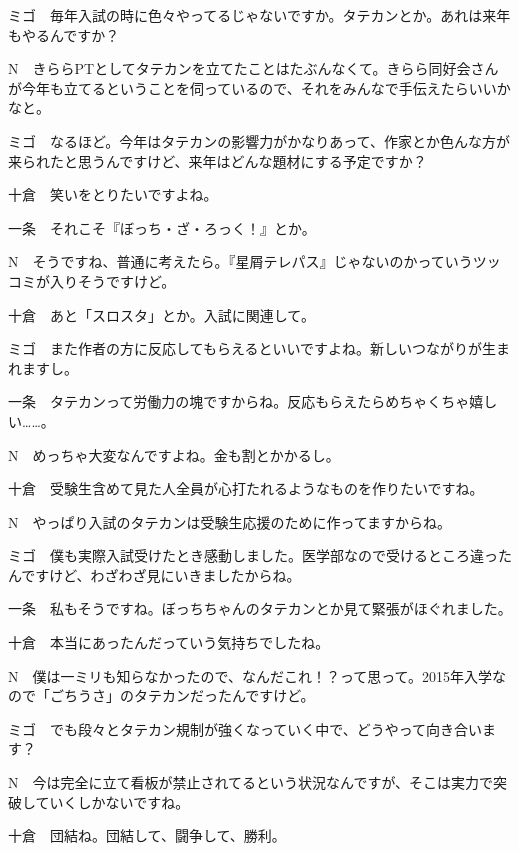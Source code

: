 \begin{multicols}{2}
\vspace{6mm}

\begin{description}
  \item{ミゴ}　毎年入試の時に色々やってるじゃないですか。タテカンとか。あれは来年もやるんですか？
  \item{N}　きららPTとしてタテカンを立てたことはたぶんなくて。きらら同好会さんが今年も立てるということを伺っているので、それをみんなで手伝えたらいいかなと。
  \item{ミゴ}　なるほど。今年はタテカンの影響力がかなりあって、作家とか色んな方が来られたと思うんですけど、来年はどんな題材にする予定ですか？
  \item{十倉}　笑いをとりたいですよね。
  \item{一条}　それこそ『ぼっち・ざ・ろっく！』とか。
  \item{N}　そうですね、普通に考えたら。『星屑テレパス』じゃないのかっていうツッコミが入りそうですけど。
  \item{十倉}　あと「スロスタ」とか。入試に関連して。
  \item{ミゴ}　また作者の方に反応してもらえるといいですよね。新しいつながりが生まれますし。
  \item{一条}　タテカンって労働力の塊ですからね。反応もらえたらめちゃくちゃ嬉しい……。
  \item{N}　めっちゃ大変なんですよね。金も割とかかるし。
  \item{十倉}　受験生含めて見た人全員が心打たれるようなものを作りたいですね。
  \item{N}　やっぱり入試のタテカンは受験生応援のために作ってますからね。
  \item{ミゴ}　僕も実際入試受けたとき感動しました。医学部なので受けるところ違ったんですけど、わざわざ見にいきましたからね。
  \item{一条}　私もそうですね。ぼっちちゃんのタテカンとか見て緊張がほぐれました。
  \item{十倉}　本当にあったんだっていう気持ちでしたね。
  \item{N}　僕は一ミリも知らなかったので、なんだこれ！？って思って。2015年入学なので「ごちうさ」のタテカンだったんですけど。
  \item{ミゴ}　でも段々とタテカン規制が強くなっていく中で、どうやって向き合います？
  \item{N}　今は完全に立て看板が禁止されてるという状況なんですが、そこは実力で突破していくしかないですね。
  \item{十倉}　団結ね。団結して、闘争して、勝利。

\end{description}
\end{multicols}
